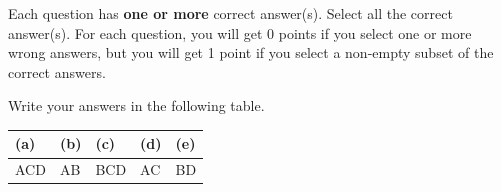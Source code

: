 
Each question has \textbf{one or more} correct answer(s). Select all the correct answer(s). For each question, you will get 0 points if you select one or more wrong answers, but you will get 1 point if you select a non-empty subset of the correct answers.

Write your answers in the following table.


\begin{table}[htbp]
	\centering
	\begin{tabular}{|p{2cm}|p{2cm}|p{2cm}|p{2cm}|p{2cm}|}
		\hline 
		(a) & (b) & (c) & (d) & (e) \\
		\hline
		 ACD  & AB & BCD & AC & BD \\
		\hline
	\end{tabular} 
\end{table}

